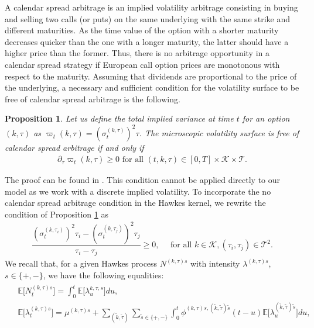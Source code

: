 \documentclass[12pt]{article}
\newtheorem{proposition}[theorem2]{Proposition}
\begin{document}
A calendar spread arbitrage is an implied volatility arbitrage consisting in buying and selling two calls (or puts) on the same underlying with the same strike and different maturities. As the time value of the option with a shorter maturity decreases quicker than the one with a longer maturity, the latter should have a higher price than the former. Thus, there is no arbitrage opportunity in a calendar spread strategy if European call option prices are monotonous with respect to the maturity. Assuming that dividends are proportional to the price of the underlying, a necessary and sufficient condition for the volatility surface to be free of calendar spread arbitrage is the following.
\begin{proposition}\label{def_calendar_spread}
Let us define the total implied variance at time $t$ for an option $(k,\tau)$ as $\varpi_t(k,\tau)= (\sigma^{(k,\tau)}_t)^2 \tau$. The microscopic volatility surface is
free of calendar spread arbitrage if and only if
\begin{align*}
    \partial_\tau \varpi_t(k,\tau)\geq 0 \text{ for all } (t,k,\tau)\in[0,T]\times\mathcal{K}\times\mathcal{T}.
\end{align*}
\end{proposition}
The proof can be found in \cite{gatheral2014arbitrage}. This condition cannot be applied directly to our model as we work with a discrete implied volatility. To incorporate the no calendar spread arbitrage condition in the Hawkes kernel, we rewrite the condition of Proposition \ref{def_calendar_spread} as
\begin{align*}
 \dfrac{(\sigma^{(k,\tau_i)}_t)^2 \tau_i - (\sigma^{(k,\tau_j)}_t)^2 \tau_j}{\tau_i - \tau_j} \geq 0, \quad \text{ for all } k\in\mathcal{K}, (\tau_i,\tau_j)\in \mathcal{T}^2.
\end{align*}
We recall that, for a given Hawkes process $N^{(k,\tau)s}$ with intensity $\lambda^{(k,\tau)s}$, $s \in \{+, -\}$, we have the following equalities:
\begin{align}\label{relationship_hawkes}
\begin{split}
    & \mathbb{E}\big[N_t^{(k,\tau)s}\big] = \int_0^t \mathbb{E}\big[\lambda^{k,\tau,s}_u\big] du, \\
    & \mathbb{E}\big[\lambda^{(k,\tau)s}_t\big] = \mu^{(k,\tau)s} + \sum_{(\tilde k,\tilde \tau)}\sum_{\tilde{s}\in \{+,-\}}\int_0^t \phi^{(k,\tau)s,(\tilde k,\tilde \tau)\tilde{s}}(t-u)\mathbb{E}\big[\lambda^{(\tilde{k},\tilde \tau)\tilde s}_u\big]du,   
\end{split}
\end{align}
\end{document}
